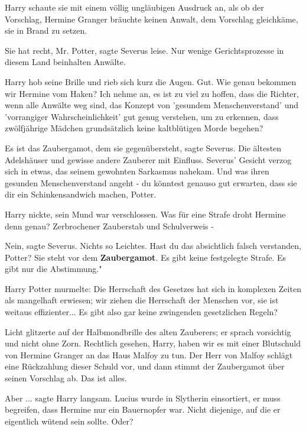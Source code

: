 Harry schaute sie mit einem völlig ungläubigen Ausdruck an, als ob der
Vorschlag, Hermine Granger bräuchte keinen Anwalt, dem Vorschlag gleichkäme, sie
in Brand zu setzen.

\glqq{}Sie hat recht, Mr. Potter\grqq{}, sagte Severus leise. \glqq{}Nur wenige
Gerichtsprozesse in diesem Land beinhalten Anwälte.\grqq{}

Harry hob seine Brille und rieb sich kurz die Augen. \glqq{}Gut. Wie genau
bekommen wir Hermine vom Haken? Ich nehme an, es ist zu viel zu hoffen, dass die
Richter, wenn alle Anwälte weg sind, das Konzept von 'gesundem Menschenverstand'
und 'vorrangiger Wahrscheinlichkeit' gut genug verstehen, um zu erkennen, dass
zwölfjährige Mädchen grundsätzlich keine kaltblütigen Morde begehen?\grqq{}

\glqq{}Es ist das Zaubergamot, dem sie gegenübersteht\grqq{}, sagte Severus.
\glqq{}Die ältesten Adelshäuser und gewisse andere Zauberer mit Einfluss.\grqq{}
Severus' Gesicht verzog sich in etwas, das seinem gewohnten Sarkasmus nahekam.
\glqq{}Und was ihren gesunden Menschenverstand angeht - du könntest genauso gut
erwarten, dass sie dir ein Schinkensandwich machen, Potter.\grqq{}

Harry nickte, sein Mund war verschlossen. \glqq{}Was für eine Strafe droht
Hermine denn genau? Zerbrochener Zauberstab und Schulverweis -\grqq{}

\glqq{}Nein\grqq{}, sagte Severus. \glqq{}Nichts so Leichtes. Hast du das
absichtlich falsch verstanden, Potter? Sie steht vor dem \textbf{Zaubergamot}.
Es gibt keine festgelegte Strafe. Es gibt nur die Abstimmung."

Harry Potter murmelte: \glqq{}Die Herrschaft des Gesetzes hat sich in komplexen
Zeiten als mangelhaft erwiesen; wir ziehen die Herrschaft der Menschen vor, sie
ist weitaus effizienter... Es gibt also gar keine zwingenden gesetzlichen
Regeln?\grqq{}

Licht glitzerte auf der Halbmondbrille des alten Zauberers; er sprach vorsichtig
und nicht ohne Zorn. \glqq{}Rechtlich gesehen, Harry, haben wir es mit einer
Blutschuld von Hermine Granger an das Haus Malfoy zu tun. Der Herr von Malfoy
schlägt eine Rückzahlung dieser Schuld vor, und dann stimmt der Zaubergamot über
seinen Vorschlag ab. Das ist alles.\grqq{}

\glqq{}Aber ...\grqq{} sagte Harry langsam. \glqq{}Lucius wurde in Slytherin
einsortiert, er muss begreifen, dass Hermine nur ein Bauernopfer war. Nicht
diejenige, auf die er eigentlich wütend sein sollte. Oder?\grqq{}

